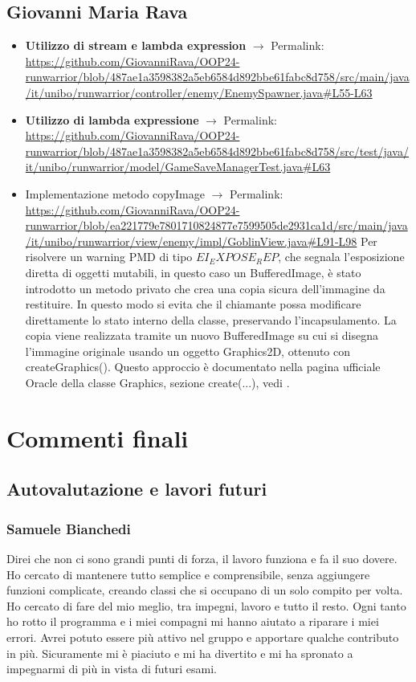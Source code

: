 \documentclass[a4paper,12pt]{report}
\begin{document}
\section{Giovanni Maria Rava}
\begin{itemize}
    \item \textbf{Utilizzo di stream e lambda expression} $\rightarrow$ Permalink: 
    \url{https://github.com/GiovanniRava/OOP24-runwarrior/blob/487ae1a3598382a5eb6584d892bbe61fabc8d758/src/main/java/it/unibo/runwarrior/controller/enemy/EnemySpawner.java#L55-L63}
    \item \textbf{Utilizzo di lambda expressione} $\rightarrow$ Permalink:
    \url{https://github.com/GiovanniRava/OOP24-runwarrior/blob/487ae1a3598382a5eb6584d892bbe61fabc8d758/src/test/java/it/unibo/runwarrior/model/GameSaveManagerTest.java#L63}
    \item {Implementazione metodo copyImage} $\rightarrow$ Permalink:
    \url{https://github.com/GiovanniRava/OOP24-runwarrior/blob/ea221779e7801710824877e7599505de2931ca1d/src/main/java/it/unibo/runwarrior/view/enemy/impl/GoblinView.java#L91-L98}
    Per risolvere un warning PMD di tipo $EI_EXPOSE_REP$, che segnala l'esposizione diretta di oggetti mutabili, in questo caso un BufferedImage, è stato introdotto un metodo privato 
    che crea una copia sicura dell'immagine da restituire. In questo modo si evita che il chiamante possa modificare direttamente lo stato interno della classe, preservando l'incapsulamento.
    La copia viene realizzata tramite un nuovo BufferedImage su cui si disegna l'immagine originale usando un oggetto Graphics2D, 
    ottenuto con createGraphics(). Questo approccio è documentato nella pagina ufficiale Oracle della classe Graphics, sezione 
    create(...), vedi \cite{oracle-graphics-create}.
\end{itemize}

\chapter{Commenti finali}
\section{Autovalutazione e lavori futuri}
\subsection{Samuele Bianchedi}
Direi che non ci sono grandi punti di forza, il lavoro funziona e fa il suo dovere. Ho cercato di mantenere tutto semplice e comprensibile,
senza aggiungere funzioni complicate, creando classi che si occupano di un solo compito per volta.
Ho cercato di fare del mio meglio, tra impegni, lavoro e tutto il resto. Ogni tanto ho rotto il programma e i miei compagni mi hanno aiutato
a riparare i miei errori. Avrei potuto essere più attivo nel gruppo e apportare qualche contributo in più.
Sicuramente mi è piaciuto e mi ha divertito e mi ha spronato a impegnarmi di più in vista di futuri esami.
\end{document}
